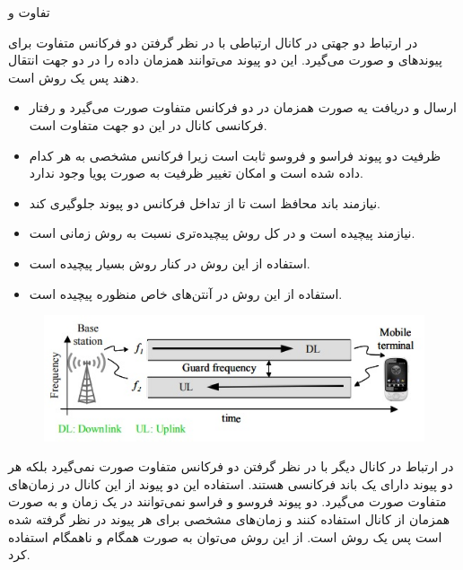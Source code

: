 \SubProblem
{تفاوت  و }
{
در
ارتباط دو جهتی در کانال ارتباطی با در نظر گرفتن دو فرکانس متفاوت برای پیوندهای
و
صورت می‌گیرد.
این دو پیوند می‌توانند همزمان داده را در دو جهت انتقال دهند پس یک روش
است.

\begin{itemize}
    \item
    ارسال و دریافت یه صورت همزمان در دو فرکانس متفاوت صورت می‌گیرد و رفتار فرکانسی کانال در این دو جهت متفاوت است.
    
    \item
    ظرفیت دو پیوند فراسو و فروسو ثابت است زیرا فرکانس مشخصی به هر کدام داده شده است و امکان تغییر ظرفیت به صورت پویا وجود ندارد.
    
    \item
    نیازمند باند محافظ
    است تا از تداخل فرکانس دو پیوند جلوگیری کند.
    
    \item
    نیازمند
    پیچیده است و در کل روش پیچیده‌تری نسبت به روش زمانی است.

    \item
    استفاده از این روش در کنار روش
    بسیار پیچیده است.
    
    \item
    استفاده از این روش در آنتن‌های خاص منظوره پیچیده است.
\end{itemize}

\begin{figure}[H]
    \includegraphics[width=12cm]{Images/FDD.jpg}
    \centering
    \caption{}
\end{figure}

در
ارتباط در کانال دیگر با در نظر گرفتن دو فرکانس متفاوت صورت نمی‌گیرد بلکه هر دو پیوند دارای یک باند فرکانسی هستند. استفاده این دو پیوند از این کانال در زمان‌های متفاوت صورت می‌گیرد.
دو پیوند فروسو و فراسو نمی‌توانند در یک زمان و به صورت همزمان از کانال استفاده کنند و زمان‌های مشخصی برای هر پیوند در نظر گرفته شده است پس یک روش
است.
از این روش می‌توان به صورت همگام
و ناهمگام
استفاده کرد.

}
